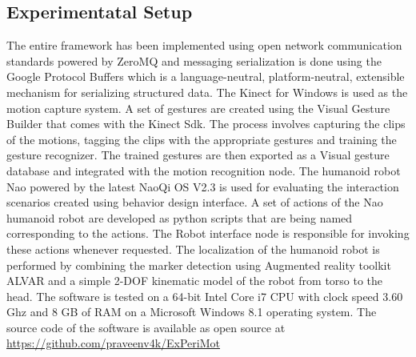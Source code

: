 \documentclass{llncs}
\begin{document}
\subsection{Experimentatal Setup}
%
The entire framework has been implemented using open network communication standards powered by ZeroMQ\cite{ZeroMQ} and messaging serialization is done using the Google Protocol Buffers\cite{ProtocolBuffers} which is a language-neutral, platform-neutral, extensible mechanism for serializing structured data. The Kinect for Windows is used as the motion capture system. A set of gestures are created using the Visual Gesture Builder that comes with the Kinect Sdk\cite{Kinect2014}. The process involves capturing the clips of the motions, tagging the clips with the appropriate gestures and training the gesture recognizer. The trained gestures are then exported as a Visual gesture database and integrated with the motion recognition node. The humanoid robot Nao powered by the latest NaoQi OS V2.3 is used for evaluating the interaction scenarios created using behavior design interface.  A set of actions of the Nao humanoid robot are developed as python scripts that are being named corresponding to the actions. The Robot interface node is responsible for invoking these actions whenever requested. The localization of the humanoid robot is performed by combining the marker detection using Augmented reality toolkit ALVAR\cite{ALVAR} and a simple 2-DOF kinematic model of the robot from torso to the head. The software is tested on a 64-bit Intel Core i7 CPU with clock speed 3.60 Ghz and 8 GB of RAM on a  Microsoft Windows 8.1 operating system. The source code of the software is available as open source at \url{https://github.com/praveenv4k/ExPeriMot}
\end{document}

